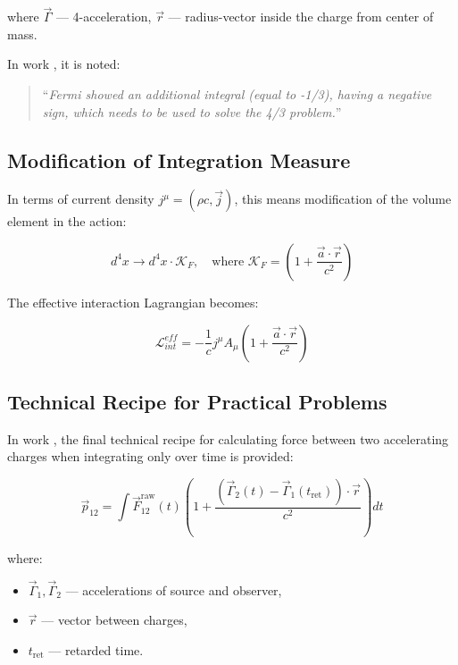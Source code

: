 \documentclass[12pt, a4paper]{article}
\begin{document}
where $\vec{\Gamma}$ --- 4-acceleration, $\vec{r}$ --- radius-vector inside the charge from center of mass.

In work \cite{FermiSolution}, it is noted:

\begin{quote}
``\textit{Fermi showed an additional integral (equal to -1/3), having a negative sign, which needs to be used to solve the 4/3 problem.}''
\end{quote}

\subsection{Modification of Integration Measure}

In terms of current density $j^\mu = (\rho c, \vec{j})$, this means modification of the volume element in the action:

\begin{equation}
d^4x \longrightarrow d^4x \cdot \mathcal{K}_F, \quad \text{where } \mathcal{K}_F = \left( 1 + \frac{\vec{a} \cdot \vec{r}}{c^2} \right)
\label{eq:measure_modification}
\end{equation}

The effective interaction Lagrangian becomes:

\begin{equation}
\mathcal{L}_{int}^{eff} = -\frac{1}{c} j^\mu A_\mu \left( 1 + \frac{\vec{a} \cdot \vec{r}}{c^2} \right)
\label{eq:lagrangian_eff}
\end{equation}

\subsection{Technical Recipe for Practical Problems}

In work \cite{FermiSolution}, the final technical recipe for calculating force between two accelerating charges when integrating only over time is provided:

\begin{equation}
\vec{p}_{12} = \int \vec{F}_{12}^{\text{raw}}(t) \left( 1 + \frac{(\vec{\Gamma}_2(t) - \vec{\Gamma}_1(t_{\text{ret}})) \cdot \vec{r}}{c^2} \right) dt
\label{eq:fermi_technical}
\end{equation}

where:
\begin{itemize}
    \item $\vec{\Gamma}_1, \vec{\Gamma}_2$ --- accelerations of source and observer,
    \item $\vec{r}$ --- vector between charges,
    \item $t_{\text{ret}}$ --- retarded time.
\end{itemize}
\end{document}
